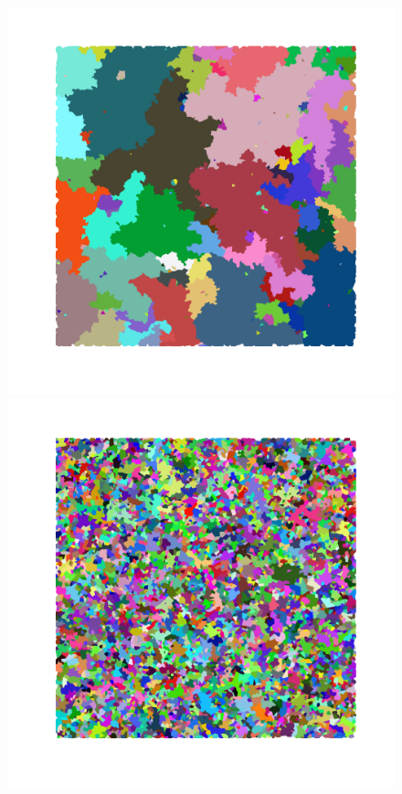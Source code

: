 \documentclass[reprint,amsmath,amssymb,aps,floatfix]{revtex4-1}
\begin{document}
\begin{figure}[!b]
  	\includegraphics[scale=0.08]{avalanche_image_size1000000_seed750_r1pt0.png}
  	\break
  	\includegraphics[scale=0.08]{avalanche_image_size1000000_seed5050_r5pt0.png}

\end{figure}
\end{document}
